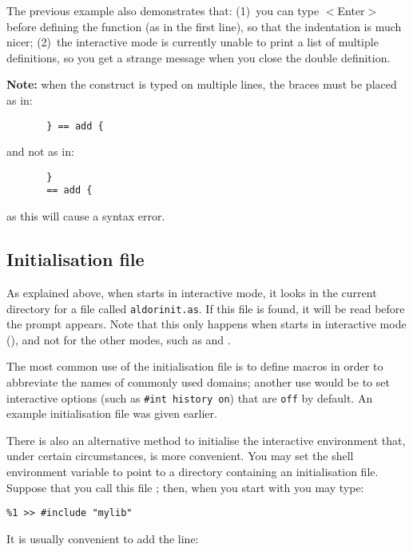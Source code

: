 The previous example also demonstrates that: (1)~you can type
$<$Enter$>$ before defining the function (as in the first line), so that the
indentation is much nicer; (2)~the interactive mode is currently unable
to print a list of multiple definitions, so you get a strange message
when you close the double definition.

{\bf Note:} when the construct  is
typed on multiple lines, the braces must be placed as in:

{\small
\begin{verbatim}
       } == add {
\end{verbatim}
}

      and not as in:
{\small
\begin{verbatim}
       }
       == add {
\end{verbatim}
}

as this will cause a syntax error. 

\subsection{Initialisation file}

As explained above, when \asharp{} starts in interactive
mode, it looks in the current directory for a file called
\verb"aldorinit.as".
If this file is found, it will be read before the prompt
appears. Note that this only happens when \asharp{} starts in
interactive mode (), and not for the other modes,
such as  and .

The most common use
of the initialisation file is to define macros in order to
abbreviate the names of commonly used domains;
another use would be to set interactive options (such as
\verb"#int history on") that are \verb"off" by default. An example
initialisation file was given earlier.

There is also an alternative method to initialise the interactive
environment that, under certain circumstances, is more convenient. 
You may set the shell environment variable  to point to
a directory containing an \asharp{} initialisation file.
Suppose that you call this file
;
then, when you start \asharp{} with  you may type:

{\small
\begin{verbatim}
%1 >> #include "mylib"
\end{verbatim}
}


It is usually convenient to add the line:

